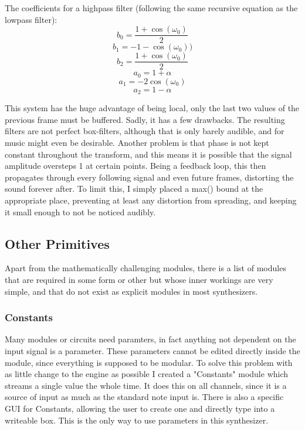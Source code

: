 \documentclass[11pt,a4paper]{article}
\begin{document}
The coefficients for a highpass filter (following the same recursive equation as the lowpass filter):
\begin{equation}
b_0 = \frac{1 + \cos(\omega_0)}{2}
\end{equation}
\begin{equation}
b_1 = -1 - \cos(\omega_0))
\end{equation}
\begin{equation}
b_2 = \frac{1 + \cos(\omega_0)}{2}
\end{equation}
\begin{equation}
a_0 = 1 + \alpha
\end{equation}
\begin{equation}
a_1 = -2\cos(\omega_0)
\end{equation}
\begin{equation}
a_2 = 1 - \alpha
\end{equation}

This system has the huge advantage of being local, only the last two values of the previous frame must be buffered.
Sadly, it has a few drawbacks. The resulting filters are not perfect box-filters, although that is only barely audible, and for music might even be desirable. Another problem is that phase is not kept constant throughout the transform, and this means it is possible that the signal amplitude oversteps 1 at certain points. Being a feedback loop, this then propagates through every following signal and even future frames, distorting the sound forever after.
To limit this, I simply placed a max() bound at the appropriate place, preventing at least any distortion from spreading, and keeping it small enough to not be noticed audibly.

\subsection{Other Primitives}

Apart from the mathematically challenging modules, there is a list of modules that are required in some form or other but whose inner workings are very simple, and that do not exist as explicit modules in most synthesizers.

\subsubsection{Constants}

Many modules or circuits need paramters, in fact anything not dependent on the input signal is a parameter. These parameters cannot be edited directly inside the module, since everything is supposed to be modular. To solve this problem with as little change to the engine as possible I created a "Constants" module which streams a single value the whole time. It does this on all channels, since it is a source of input as much as the standard note input is. There is also a specific GUI for Constants, allowing the user to create one and directly type into a writeable box. This is the only way to use parameters in this synthesizer.
\end{document}
